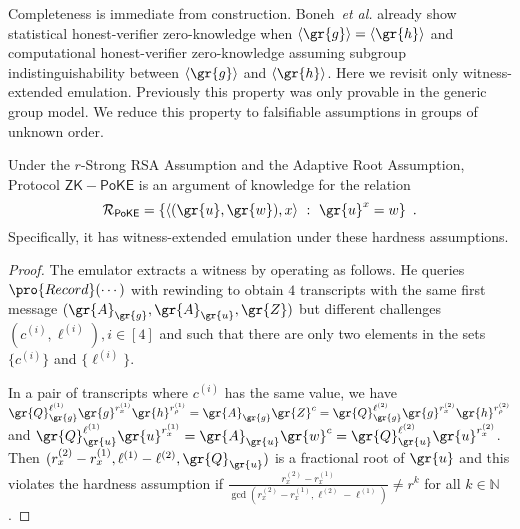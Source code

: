 Completeness is immediate from construction. Boneh~\emph{et al.} already show statistical honest-verifier zero-knowledge when $\langle \gr{g} \rangle = \langle \gr{h} \rangle$ and computational honest-verifier zero-knowledge assuming subgroup indistinguishability between $\langle \gr{g} \rangle$ and $\langle \gr{h} \rangle$. Here we revisit only witness-extended emulation. Previously this property was only provable in the generic group model. We reduce this property to falsifiable assumptions in groups of unknown order.

\begin{theorem}
Under the $r$-Strong RSA Assumption and the Adaptive Root Assumption, Protocol $\mathsf{ZK-PoKE}$ is an argument of knowledge for the relation
\[
	\mathcal{R}_\mathsf{PoKE} = \{ \langle (\gr{u}, \gr{w}), x \rangle \ : \ \gr{u}^x = w \} \enspace .
\]
Specifically, it has witness-extended emulation under these hardness assumptions.
\end{theorem}

\begin{proof}
The emulator extracts a witness by operating as follows. He queries $\pro{Record}(\cdots)$ with rewinding to obtain $4$ transcripts with the same first message $(\gr{A}_\gr{g}, \gr{A}_\gr{u}, \gr{Z})$ but different challenges $(c^{(i)}, \ell^{(i)}), i \in [4]$ and such that there are only two elements in the sets $\{c^{(i)}\}$ and $\{\ell^{(i)}\}$.

In a pair of transcripts where $c^{(i)}$ has the same value, we have $\gr{Q}_\gr{g}^{\ell^{(1)}}\gr{g}^{r_x^{(1)}}\gr{h}^{r_\rho^{(1)}} = \gr{A}_\gr{g} \gr{Z}^c = \gr{Q}_\gr{g}^{\ell^{(2)}}\gr{g}^{r_x^{(2)}}\gr{h}^{r_\rho^{(2)}}$ and $\gr{Q}_\gr{u}^{\ell^{(1)}} \gr{u}^{r_x^{(1)}} = \gr{A}_\gr{u} \gr{w}^c = \gr{Q}_\gr{u}^{\ell^{(2)}}\gr{u}^{r_x^{(2)}}$. Then $(r_x^{(2)} - r_x^{(1)}, \ell^{(1)} - \ell^{(2)}, \gr{Q}_\gr{u})$ is a fractional root of $\gr{u}$ and this violates the hardness assumption if $\frac{r_x^{(2)} - r_x^{(1)}}{\gcd(r_x^{(2)} - r_x^{(1)}, \ell^{(2)} - \ell^{(1)})} \neq r^k$ for all $k \in \mathbb{N}$.
\end{proof}
